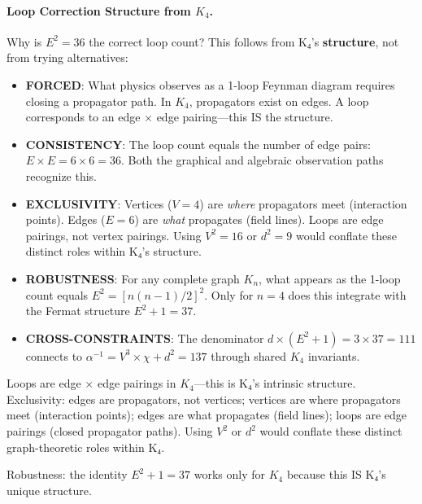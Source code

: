 \documentclass[11pt,a4paper]{book}
\begin{document}
\paragraph{Loop Correction Structure from $K_4$.}
Why is $E^2 = 36$ the correct loop count? This follows from K₄'s \textbf{structure},
not from trying alternatives:

\begin{itemize}
\item \textbf{FORCED}: What physics observes as a 1-loop Feynman diagram requires closing a propagator path. In $K_4$,
  propagators exist on edges. A loop corresponds to an edge $\times$ edge pairing—this IS the structure.
\item \textbf{CONSISTENCY}: The loop count equals the number of edge pairs:
  $E \times E = 6 \times 6 = 36$. Both the graphical and algebraic observation paths recognize this.
\item \textbf{EXCLUSIVITY}: Vertices ($V=4$) are \emph{where} propagators meet (interaction points).
  Edges ($E=6$) are \emph{what} propagates (field lines). Loops are edge pairings, not
  vertex pairings. Using $V^2=16$ or $d^2=9$ would conflate these distinct roles within K₄'s structure.
\item \textbf{ROBUSTNESS}: For any complete graph $K_n$, what appears as the 1-loop count equals $E^2 = [n(n-1)/2]^2$.
  Only for $n=4$ does this integrate with the Fermat structure $E^2+1=37$.
\item \textbf{CROSS-CONSTRAINTS}: The denominator $d \times (E^2+1) = 3 \times 37 = 111$
  connects to $\alpha^{-1} = V^3 \times \chi + d^2 = 137$ through shared $K_4$ invariants.
\end{itemize}

Loops are edge $\times$ edge pairings in $K_4$—this is K₄'s intrinsic structure. Exclusivity: edges are propagators, not vertices; vertices are where propagators meet (interaction points); edges are what propagates (field lines); loops are edge pairings (closed propagator paths). Using $V^2$ or $d^2$ would conflate these distinct graph-theoretic roles within K₄.

Robustness: the identity $E^2 + 1 = 37$ works only for $K_4$ because this IS K₄'s unique structure.
\end{document}
